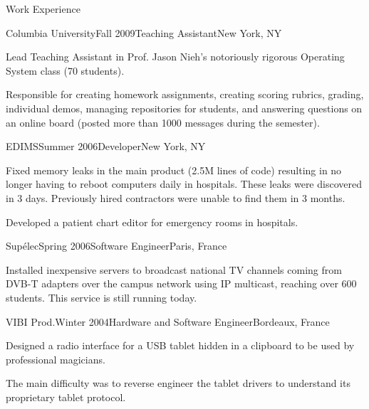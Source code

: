 \documentclass{resume} %
\newcommand{\supelec}{{Sup\'{e}lec}\xspace}
\begin{document}
\begin{rSection}{Work Experience}
\begin{rSubsection}{Columbia University}{Fall 2009}{Teaching Assistant}{New York, NY}
\item Lead Teaching Assistant in Prof. Jason Nieh's notoriously rigorous Operating System class (70 students).
\item Responsible for creating homework assignments, creating scoring rubrics, grading,
individual demos, managing repositories for students, and answering questions on an online board (posted more
than 1000 messages during the semester).
\end{rSubsection}

\begin{rSubsection}{EDIMS}{Summer 2006}{Developer}{New York, NY}
\item Fixed memory leaks in the main product (2.5M lines of code)
      resulting in no longer having to reboot computers daily in hospitals.
      These leaks were discovered in 3 days. Previously hired contractors were unable to find them in 3 months.


\item Developed a patient chart editor for emergency rooms in hospitals.
\end{rSubsection}

\begin{rSubsection}{\supelec}{Spring 2006}{Software Engineer}{Paris, France}
\item Installed inexpensive servers to broadcast national TV channels coming
      from DVB-T adapters over the campus network using IP multicast,
      reaching over 600 students. This service is still running today.
\end{rSubsection}

\begin{rSubsection}{VIBI Prod.}{Winter 2004}{Hardware and Software Engineer}{Bordeaux, France}
\item Designed a radio interface for a USB tablet hidden in a clipboard to be used by professional magicians.
\item The main difficulty was to reverse engineer the tablet drivers to understand its proprietary tablet protocol.
\end{rSubsection}


\end{rSection}
\end{document}
